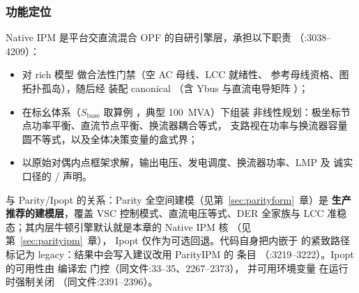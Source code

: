 \subsubsection*{功能定位}
Native IPM 是平台交直流混合 OPF 的自研引擎层，承担以下职责
（:3038--4209）：
\begin{itemize}
  \item 对 rich 模型  做合法性门禁（空 AC 母线、LCC 就绪性、
        参考母线资格、图拓扑孤岛），随后经 
        装配 canonical （含 Ybus 与直流电导矩阵 ）；
  \item 在标幺体系（$S_{\mathrm{base}}$ 取算例 ，典型 100~MVA）下组装
        非线性规划：极坐标节点功率平衡、直流节点平衡、换流器耦合等式，
        支路视在功率与换流器容量圆不等式，以及全体决策变量的盒式界；
  \item 以原始对偶内点框架求解，输出电压、发电调度、换流器功率、LMP 及
        诚实口径的  /  声明。
\end{itemize}
与 Parity/Ipopt 的关系：Parity 全空间建模（见第~\ref{sec:parityform}~章）是
\textbf{生产推荐的建模层}，覆盖 VSC 控制模式、直流电压等式、DER 全家族与 LCC
准稳态；其内层牛顿引擎默认就是本章的 Native IPM 核
（见第~\ref{sec:parityipm}~章），
Ipopt 仅作为可选回退。代码自身把内嵌于  的紧致路径标记为
legacy：结果中会写入建议改用 ParityIPM 的  条目
（:3219--3222）。Ipopt 的可用性由
编译宏  门控（同文件:33--35、2267--2373），
并可用环境变量  在运行时强制关闭
（同文件:2391--2396）。

